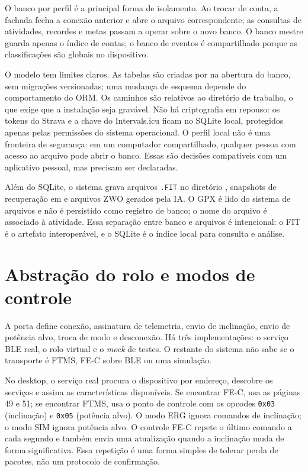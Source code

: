 O banco por perfil é a principal forma de isolamento. Ao trocar de conta, a
fachada fecha a conexão anterior e abre o arquivo correspondente; as consultas
de atividades, recordes e metas passam a operar sobre o novo banco. O banco
mestre guarda apenas o índice de contas; o banco de eventos é compartilhado
porque as classificações são globais no dispositivo.

O modelo tem limites claros. As tabelas são criadas por  na
abertura do banco, sem migrações versionadas; uma mudança de esquema depende do
comportamento do ORM. Os caminhos são relativos ao diretório de trabalho, o que
exige que a instalação seja gravável. Não há criptografia em repouso: os tokens
do Strava e a chave do Intervals.icu ficam no SQLite local, protegidos apenas
pelas permissões do sistema operacional. O perfil local não é uma fronteira de
segurança: em um computador compartilhado, qualquer pessoa com acesso ao
arquivo pode abrir o banco. Essas são decisões compatíveis com um aplicativo
pessoal, mas precisam ser declaradas.

Além do SQLite, o sistema grava arquivos \texttt{.FIT} no diretório
, snapshots de recuperação em  e
arquivos ZWO gerados pela IA. O GPX é lido do sistema de arquivos e não é
persistido como registro de banco; o nome do arquivo é associado à atividade.
Essa separação entre banco e arquivos é intencional: o FIT é o artefato
interoperável, e o SQLite é o índice local para consulta e análise.

\section{Abstração do rolo e modos de controle}
\label{sec:treinador}

A porta  define conexão, assinatura de telemetria, envio de
inclinação, envio de potência alvo, troca de modo e desconexão. Há três
implementações: o serviço BLE real, o rolo virtual e o \textit{mock} de
testes. O restante do sistema não sabe se o transporte é FTMS, FE-C sobre BLE
ou uma simulação.

No desktop, o serviço real procura o dispositivo por endereço, descobre os
serviços e assina as características disponíveis. Se encontrar FE-C, usa as
páginas 49 e 51; se encontrar FTMS, usa o ponto de controle com os opcodes
\texttt{0x03} (inclinação) e \texttt{0x05} (potência alvo). O modo ERG ignora
comandos de inclinação; o modo SIM ignora potência alvo. O controle FE-C repete
o último comando a cada segundo e também envia uma atualização quando a
inclinação muda de forma significativa. Essa repetição é uma forma simples de
tolerar perda de pacotes, não um protocolo de confirmação.

